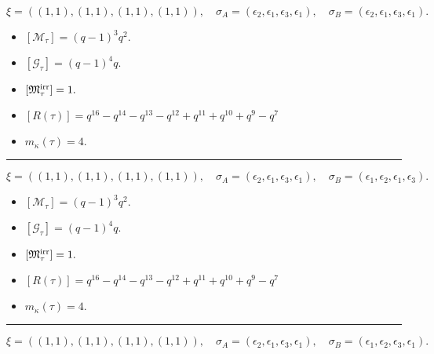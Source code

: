 \documentclass[10pt,a4paper]{amsart}
\begin{document}
$$\xi = ({(1, 1)}, {(1, 1)}, {(1, 1)}, {(1, 1)}),\quad \sigma_A = ({{\epsilon_2}}, {{\epsilon_1}}, {{\epsilon_3}}, {{\epsilon_1}}),\quad \sigma_B = ({{\epsilon_2}}, {{\epsilon_1}}, {{\epsilon_3}}, {{\epsilon_1}}).$$

\begin{itemize}
 \item $[\mathcal{M}_{\tau}] = {\left(q - 1\right)}^{3} q^{2} .$

 \item $[\mathcal{G}_{\tau}] = {\left(q - 1\right)}^{4} q .$

 \item $[{\frak M}_{\tau}^{\textrm{irr}}] = 1 .$

 \item $[R(\tau)] = q^{16} - q^{14} - q^{13} - q^{12} + q^{11} + q^{10} + q^{9} - q^{7} $

 \item $m_{\kappa}(\tau) = 4 .$

 \end{itemize}
\noindent\rule{8cm}{0.4pt}

$$\xi = ({(1, 1)}, {(1, 1)}, {(1, 1)}, {(1, 1)}),\quad \sigma_A = ({{\epsilon_2}}, {{\epsilon_1}}, {{\epsilon_3}}, {{\epsilon_1}}),\quad \sigma_B = ({{\epsilon_1}}, {{\epsilon_2}}, {{\epsilon_1}}, {{\epsilon_3}}).$$

\begin{itemize}
 \item $[\mathcal{M}_{\tau}] = {\left(q - 1\right)}^{3} q^{2} .$

 \item $[\mathcal{G}_{\tau}] = {\left(q - 1\right)}^{4} q .$

 \item $[{\frak M}_{\tau}^{\textrm{irr}}] = 1 .$

 \item $[R(\tau)] = q^{16} - q^{14} - q^{13} - q^{12} + q^{11} + q^{10} + q^{9} - q^{7} $

 \item $m_{\kappa}(\tau) = 4 .$

 \end{itemize}
\noindent\rule{8cm}{0.4pt}

$$\xi = ({(1, 1)}, {(1, 1)}, {(1, 1)}, {(1, 1)}),\quad \sigma_A = ({{\epsilon_2}}, {{\epsilon_1}}, {{\epsilon_3}}, {{\epsilon_1}}),\quad \sigma_B = ({{\epsilon_1}}, {{\epsilon_2}}, {{\epsilon_3}}, {{\epsilon_1}}).$$
\end{document}

